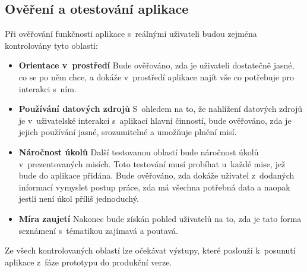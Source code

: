 \subsection{Ověření a otestování aplikace}
Při ověřování funkčnosti aplikace s~reálnými uživateli budou zejména kontrolovány tyto oblasti: 

\begin{itemize}
	\item \textbf{Orientace v~prostředí}
		Bude ověřováno, zda je uživateli dostatečně jasné, co se po něm chce, a dokáže v~prostředí aplikace najít vše co potřebuje pro interakci s~ním. 
	\item \textbf{Používání datových zdrojů}
		S~ohledem na to, že nahlížení datových zdrojů je v~uživatelské interakci s~aplikací hlavní činností, bude ověřováno, zda je jejich používání jasné, srozumitelné a umožňuje plnění misí. 
	\item \textbf{Náročnost úkolů}
		Další testovanou oblastí bude náročnost úkolů v~prezentovaných misích. Toto testování musí probíhat u~každé mise, jež bude do aplikace přidána. Bude ověřováno, zda dokáže uživatel z~dodaných informací vymyslet postup práce, zda má všechna potřebná data a naopak jestli není úkol příliš jednoduchý.
	\item \textbf{Míra zaujetí}
		Nakonec bude získán pohled uživatelů na to, zda je tato forma seznámení s~tématikou zajímavá a poutavá.
\end{itemize}

Ze všech kontrolovaných oblastí lze očekávat výstupy, které poslouží k~posunutí aplikace z~fáze prototypu do produkční verze.    


